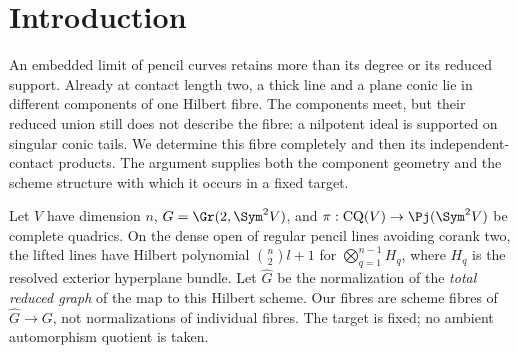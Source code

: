 \begin{abstract}
We determine complete scheme fibres of the Hilbert graph of lifted
quadratic pencils along the first nonreduced corank-two boundary.
The local fibre of contact length two has exactly two reduced
components, a projective four-space of conic tails and a Hirzebruch
surface compactifying primitive line jets. They meet along the
projective line of doubled tails. At that locus its equation is
$(eA,eB,e^2C)$, which records a square-zero nilpotent ideal invisible
in its reduced support. For several contacts of lengths one and
two, with arbitrary larger Smith exponents, the whole fibre is the
product of these local schemes. This determines all components,
intersections, dimensions and nilpotence orders in that class.
The proof constructs a Hilbert--Burch graph chart with a regular
inverse and an explicit fixed-target comparison on completed
embedded deformation functors. The underlying multiplication
ideals are balanced products of symmetric minor ideals over
arbitrary complex base algebras.
\end{abstract}
\maketitle
\section{Introduction}
\label{sec:paper-ii-v163}
An embedded limit of pencil curves retains more than its degree or
its reduced support. Already at contact length two, a thick line
and a plane conic lie in different components of one Hilbert fibre.
The components meet, but their reduced union still does not describe
the fibre: a nilpotent ideal is supported on singular conic tails.
We determine this fibre completely and then its independent-contact
products. The argument supplies both the component geometry and
the scheme structure with which it occurs in a fixed target.

Let $V$ have dimension $n$, $G=\Gr(2,\Sym^2V)$, and
$\pi:\mathrm{CQ}(V)\to\Pj(\Sym^2V)$ be complete quadrics.
On the dense open of regular pencil lines avoiding corank two,
the lifted lines have Hilbert polynomial $\binom n2l+1$ for
$\bigotimes_{q=1}^{n-1}H_q$, where $H_q$ is the resolved exterior
hyperplane bundle. Let $\widehat G$ be the normalization of the
\emph{total reduced graph} of the map to this Hilbert scheme.
Our fibres are scheme fibres of $\widehat G\to G$, not
normalizations of individual fibres. The target is fixed; no
ambient automorphism quotient is taken.

